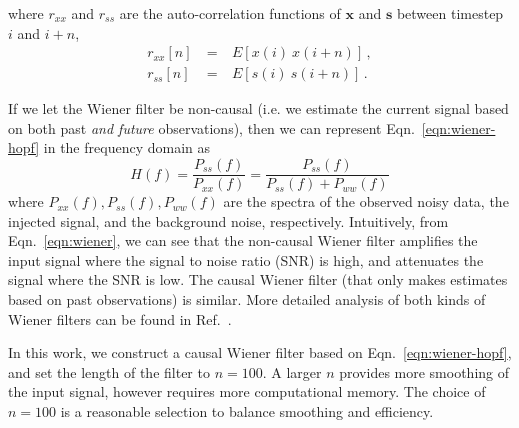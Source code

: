 \documentclass[paper-main.tex]{subfiles}
\begin{document}
where $r_{xx}$ and $r_{ss}$ are the auto-correlation functions of $\mathbf{x}$ and $\mathbf{s}$ between timestep $i$ and $i+n$, 
\begin{eqnarray} 
r_{xx}[n] &~=~& E[x(i)~x(i+n)] \,,\\
r_{ss}[n] &~=~& E[s(i)~s(i+n)] \,.
\end{eqnarray} 


If we let the Wiener filter be non-causal (i.e. we estimate the current signal based on both past \emph{and future} observations), then we can represent Eqn.~\ref{eqn:wiener-hopf} in the frequency domain as
\begin{equation}
\label{eqn:wiener}
    H(f)=\frac{P_{ss}(f)}{P_{xx}(f)}=\frac{P_{ss}(f)}{P_{ss}(f)+P_{ww}(f)}
\end{equation}
where $P_{xx}(f), P_{ss}(f), P_{ww}(f)$ are the spectra of the observed noisy data, the injected signal, and the background noise, respectively. Intuitively, from Eqn.~\ref{eqn:wiener}, we can see that the non-causal Wiener filter amplifies the input signal where the signal to noise ratio (SNR) is high, and attenuates the signal where the SNR is low. The causal Wiener filter (that only makes estimates based on past observations) is similar. More detailed analysis of both kinds of Wiener filters can be found in Ref.~\citep{10.5555/151045}.

In this work, we construct a causal Wiener filter based on Eqn.~\ref{eqn:wiener-hopf}, and set the length of the filter to $n=100$. 
A larger $n$ provides more smoothing of the input signal, however requires more computational memory. 
The choice of $n=100$ is a reasonable selection to balance smoothing and efficiency. 
\end{document}
